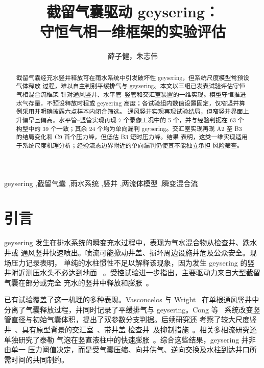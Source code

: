 \documentclass[preprint,12pt]{elsarticle}
\begin{document}
\begin{frontmatter}

\title{截留气囊驱动 geysering：\\
守恒气相一维框架的实验评估}

\author{薛子健，朱志伟}

\begin{abstract}
截留气囊经充水竖井释放可在雨水系统中引发破坏性 geysering，但系统尺度模型常预设气体释放
过程，难以自主判别平缓排气与 geysering。本文以三组已发表试验评估守恒气相混合流框架
针对通风竖井、水平管--竖管和交汇室装置的一维实现。模型守恒推进水气存量，不预设释放时程或
geysering 高度；各试验组内数值设置固定，仅窄竖井算例采用并明确披露六点样本内闭合筛选。
通风竖井实现再现试验结局，但窄竖井界面上升偏早且偏高。水平管--竖管实现再现
7 个录像工况中的 5 个，并与经验判据在 63 个构型中的 39 个一致；其余 24 个均为单向漏判
geysering。交汇室实现再现 A2 至 B3 的结局变化和 C9 首个压力峰，但低估 B3 短时压力峰。结果
表明，这类一维实现适用于系统尺度机理分析；经验流态边界附近的单向漏判仍使其不能独立承担
风险筛查。
\end{abstract}

\begin{keyword}
geysering \sep 截留气囊 \sep 雨水系统 \sep 竖井 \sep 两流体模型 \sep 瞬变混合流
\end{keyword}

\end{frontmatter}

\section{引言}
\label{sec:intro}

geysering 发生在排水系统的瞬变充水过程中，表现为气水混合物从检查井、跌水井或
通风竖井快速喷出。喷流可能掀动井盖、损坏周边设施并危及公众安全。现场压力记录表明，
单纯的水柱惯性不足以解释该现象，因为发生 geysering 的竖井附近测压水头不必达到地面
~\cite{wright2011note}。受控试验进一步指出，主要驱动力来自大型截留气囊在部分或完全
充水的竖井中释放和膨胀~\cite{vasconcelos2011,wright2011note}。

已有试验覆盖了这一机理的多种表现。Vasconcelos 与 Wright~\cite{vasconcelos2011}
在单根通风竖井中分离了气囊释放过程，并同时记录了平缓排气与 geysering。Cong 等
~\cite{cong2017}系统改变竖管直径与初始气囊体积，提出了双参数分支判据。后续研究还
考察了较大尺度竖井~\cite{muller2017}、具有原型背景的交汇室~\cite{liu2020}、带井盖
检查井~\cite{zhang2022}及抑制措施~\cite{qian2020}。相关多相流研究还单独研究了泰勒
气泡在竖直液柱中的快速膨胀~\cite{zhouprosperetti2019}。综合这些结果，geysering 并非由单一
压力阈值决定，而是受气囊压缩、向井供气、逆向交换及水柱到达井口所需时间的\mbox{共同制约}。
\end{document}
